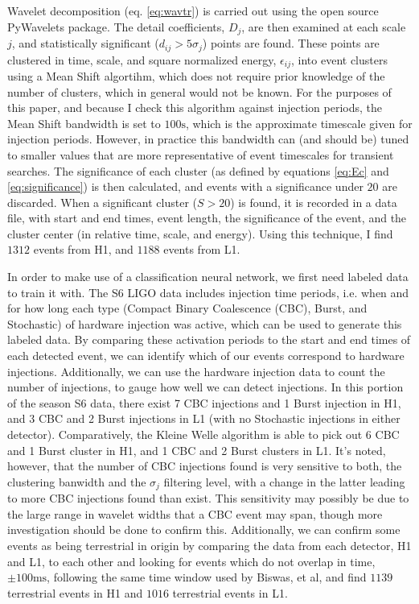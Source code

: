 \documentclass{article}
\begin{document}
Wavelet decomposition (eq. \ref{eq:wavtr}) is carried out using the open source PyWavelets package\citep{Wasilewski}. The detail coefficients, $D_{j}$, are then examined at each scale $j$, and statistically significant ($d_{ij} > 5\sigma_{j}$) points are found. These points are clustered in time, scale, and square normalized energy, $\epsilon_{ij}$, into event clusters using a Mean Shift algortihm\citep{scikit-learn}, which does not require prior knowledge of the number of clusters, which in general would not be known. For the purposes of this paper, and because I check this algorithm against injection periods, the Mean Shift bandwidth is set to $100\mathrm{s}$, which is the approximate timescale given for injection periods. However, in practice this bandwidth can (and should be) tuned to smaller values that are more representative of event timescales for transient searches. The significance of each cluster (as defined by equations \ref{eq:Ec} and \ref{eq:significance}) is then calculated, and events with a significance under $20$ are discarded. When a significant cluster ($S > 20$) is found, it is recorded in a data file, with start and end times, event length, the significance of the event, and the cluster center (in relative time, scale, and energy). Using this technique, I find $1312$ events from H1, and $1188$ events from L1.

In order to make use of a classification neural network, we first need labeled data to train it with. The S6 LIGO data includes injection time periods, i.e. when and for how long each type (Compact Binary Coalescence (CBC), Burst, and Stochastic) of hardware injection was active, which can be used to generate this labeled data. By comparing these activation periods to the start and end times of each detected event, we can identify which of our events correspond to hardware injections. Additionally, we can use the hardware injection data to count the number of injections, to gauge how well we can detect injections. In this portion of the season S6 data, there exist 7 CBC injections and 1 Burst injection in H1, and 3 CBC and 2 Burst injections in L1 (with no Stochastic injections in either detector). Comparatively, the Kleine Welle algorithm is able to pick out 6 CBC and 1 Burst cluster in H1, and 1 CBC and 2 Burst clusters in L1. It's noted, however, that the number of CBC injections found is very sensitive to both, the clustering banwidth and the $\sigma_{j}$ filtering level, with a change in the latter leading to more CBC injections found than exist. This sensitivity may possibly be due to the large range in wavelet widths that a CBC event may span, though more investigation should be done to confirm this. Additionally, we can confirm some events as being terrestrial in origin by comparing the data from each detector, H1 and L1, to each other and looking for events which do not overlap in time, $\pm100\mathrm{ms}$, following the same time window used by Biswas, et al\citep{Biswas2013}, and find $1139$ terrestrial events in H1 and $1016$ terrestrial events in L1.
\end{document}
